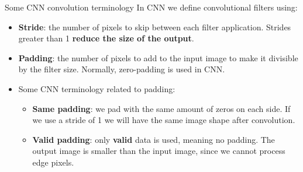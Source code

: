 \documentclass[9pt, aspectratio=169]{beamer}
\begin{document}
\begin{frame}
    {Some CNN convolution terminology}
    In CNN we define convolutional filters using:

    \begin{itemize}
        \item \textbf{Stride}: the number of pixels to skip between each filter application. Strides greater than 1 \textbf{reduce the size of the output}.
        \item \textbf{Padding}: the number of pixels to add to the input image to make it divisible by the filter size. Normally, zero-padding is used in CNN.
              \pause
        \item Some CNN terminology related to padding:
              \begin{itemize}
                  \item \textbf{Same padding}: we pad with the same amount of zeros on each side. If we use a stride of 1 we will have the same image shape after convolution.
                  \item \textbf{Valid padding}: only \textbf{valid} data is used, meaning no padding. The output image is smaller than the input image, since we cannot process edge pixels.
              \end{itemize}
    \end{itemize}
\end{frame}
\end{document}
